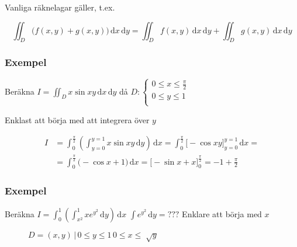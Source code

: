 \documentclass{article}
\let\oldsqrt\sqrt
\renewcommand*{\sqrt}[2][\ ]{\oldsqrt[#1]{#2} }
\begin{document}
Vanliga räknelagar gäller, t.ex. 

$$
	\iint_D \Big(f(x,y)+g(x,y)\Big) \,\mathrm{d}x\,\mathrm{d}y = \iint_D f(x,y) \,\mathrm{d}x\,\mathrm{d}y + \iint_D g(x,y) \,\mathrm{d}x\,\mathrm{d}y
$$

\newpage
\subsubsection{Exempel}
Beräkna $I = \iint_D x\sin{xy} \,\mathrm{d}x\,\mathrm{d}y$   då $D: 
\begin{cases}
	0 \leq x \leq \frac{\pi}{2} \\
	0 \leq y \leq 1 \\
\end{cases}$

Enklast att börja med att integrera över $y$

\begin{align*}
	I &= \int_0^{\frac{\pi}{2}} \left(\int_{y=0}^{y=1} x\sin{xy} \,\mathrm{d}y \right) \,\mathrm{d}x = \int_0^{\frac{\pi}{2}} \Bigg[ -\cos{xy} \Bigg]_{y=0}^{y=1} \,\mathrm{d}x = \\
	  &= \int_0^{\frac{\pi}{2}} \Bigg( -\cos{x} + 1 \Bigg) \,\mathrm{d}x = \Bigg[ -\sin{x} + x \Bigg]_0^{\frac{\pi}{2}} = -1 + \frac{\pi}{2}
\end{align*}

\subsubsection{Exempel}
Beräkna $I = \int_0^1 \left( \int_{x^2}^1 xe^{y^2} \,\mathrm{d}y \right) \,\mathrm{d}x$    $\int e^{y^2} \,\mathrm{d}y = ???$ Enklare att börja med $x$

\begin{figure}[ht] 
  \caption{$D={(x,y) \, | \, 0 \leq y \leq 1 \, 0 \leq x \leq \sqrt{y}}$} \label{fig:9.4}
\end{figure}
\end{document}

